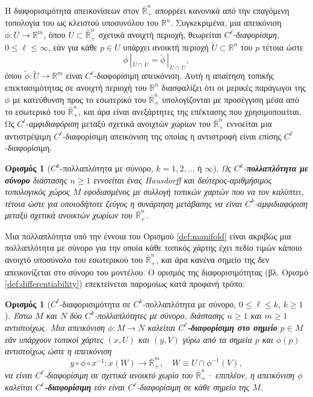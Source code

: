 \documentclass[11pt,a4paper,twoside,openright]{book}
\newtheorem{definition}[lemma]{Ορισμός}
\begin{document}
Η διαφορισιμότητα απεικονίσεων στον $\bar{\mathbb{R}}^n_+$
απορρέει κανονικά από την επαγόμενη τοπολογία του ως κλειστού υποσυνόλου του $\mathbb{R}^n$. Συγκεκριμένα, μια απεικόνιση
$\phi: U \to \mathbb{R}^m$, όπου $U \subset \bar{\mathbb{R}}^n_+$ σχετικά ανοιχτή περιοχή, θεωρείται $C^\ell$-\textit{διαφορίσιμη}, $0 \le \ell \le \infty$, εάν για κάθε $p \in U$ υπάρχει ανοικτή περιοχή $\widetilde{U} \subset \mathbb{R}^n$ του $p$ τέτοια ώστε
\begin{equation}\label{eq:smoothness-on-closed-subset}
\phi\, |_{\, \widetilde{U} \cap \, U}
=
\widetilde{\phi}\, |_{\, \widetilde{U} \cap \, U},
\end{equation}
όπου $\widetilde{\phi}: \widetilde{U} \to \mathbb{R}^m$ είναι $C^\ell$-διαφορίσιμη απεικόνιση.
Αυτή η απαίτηση τοπικής επεκτασιμότητας σε ανοιχτή περιοχή του $\mathbb{R}^n$ διασφαλίζει ότι οι μερικές παράγωγοι της $\phi$ με κατεύθυνση προς το εσωτερικό του $\bar{\mathbb{R}}^n_+$ υπολογίζονται με προσέγγιση μέσα από το εσωτερικό του $\bar{\mathbb{R}}^n_+$, και άρα είναι ανεξάρτητες της επέκτασης που χρησιμοποιείται. Ως $C^\ell$-\textit{αμφιδιαφόριση} μεταξύ σχετικά ανοιχτών χωρίων του $\bar{\mathbb{R}}^n_+$ εννοείται μια αντιστρέψιμη $C^\ell$-διαφορίσιμη απεικόνιση της οποίας η αντιστροφή είναι επίσης $C^\ell$-διαφορίσιμη.
\begin{definition}[$C^k$-πολλαπλότητα με σύνορο, $k=1,2, \dots$ ή $\infty$]\label{def:manifold-with-boundary}
Ως $C^k$-\textbf{πολλαπλότητα με σύνορο} διάστασης $n \ge 1$
εννοείται ένας Hausdorff και δεύτερος-αριθμήσιμος τοπολογικός χώρος $Μ$ εφοδιασμένος με συλλογή τοπικών χαρτών που να τον καλύπτει, τέτοια ώστε για οποιοδήποτε ζεύγος η συνάρτηση μετάβασης να είναι $C^k$-αμφιδιαφόριση μεταξύ σχετικά ανοικτών χωρίων του $\bar{\mathbb{R}}^n_+$.
\end{definition}
\noindent
Μια πολλαπλότητα υπό την έννοια του Ορισμού \ref{def:manifold} είναι ακριβώς μια πολλαπλότητα με σύνορο για την οποία κάθε τοπικός χάρτης έχει πεδίο τιμών κάποιο ανοιχτό υποσύνολο του εσωτερικού του $\bar{\mathbb{R}}^n_+$, και άρα κανένα σημείο της δεν απεικονίζεται στο σύνορο του μοντέλου.
Ο ορισμός της διαφορισιμότητας (βλ. Ορισμό \ref{def:differentiability}) επεκτείνεται παρομοίως κατά προφανή τρόπο:
\begin{definition}[$C^\ell$-διαφορισιμότητα σε $C^k$-πολλαπλότητα με σύνορο, $0 \le \ell \le k$, $k \ge 1$]\label{def:differentiability-on-manifold-with-boundary}
Έστω $M$ και $N$ δύο $C^k$-πολλαπλότητες με σύνορο, διάστασης $n \ge 1$ και $m \ge 1$ αντιστοίχως.
Μια απεικόνιση $\phi: M \to N$ καλείται \textbf{$C^\ell$-διαφορίσιμη στο σημείο} $p \in M$ εάν υπάρχουν
τοπικοί χάρτες $(x, U)$ και $(y,V)$
γύρω από τα σημεία $p$ και $\phi(p)$ αντιστοίχως ώστε
η απεικόνιση
\begin{equation*}
y \circ \phi \circ x^{-1}: x(W) \to \bar{\mathbb{R}}^m_+,
\quad W \equiv U \cap \phi^{-1}(V),
\end{equation*}
να είναι $C^\ell$-διαφορίσιμη σε σχετικά ανοικτό χωρίο του $\bar{\mathbb{R}}^n_+$· επιπλέον, η απεικόνιση $\phi$ καλείται \textbf{$C^\ell$-διαφορίσιμη} εάν είναι $C^\ell$-διαφορίσιμη σε κάθε σημείο της $M$.
\end{definition}
\end{document}
